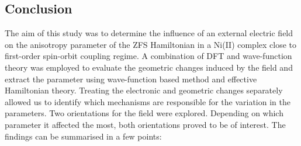 \documentclass[12pt,a4paper]{report}
\numberwithin{equation}{section}
\begin{document}
\newpage
\subsection{Conclusion}

The aim of this study was to determine the influence of an external electric field on the anisotropy parameter of the ZFS Hamiltonian in a Ni(II) complex close to first-order spin-orbit coupling regime. 
A combination of DFT and wave-function theory was employed to evaluate the geometric changes induced by the field and extract the parameter using wave-function based method and effective Hamiltonian theory.
Treating the electronic and geometric changes separately allowed us to identify which mechanisms are responsible for the variation in the parameters.
Two orientations for the field were explored. Depending on which parameter it affected the most, both orientations proved to be of interest.
The findings can be summarised in a few points:
\end{document}
